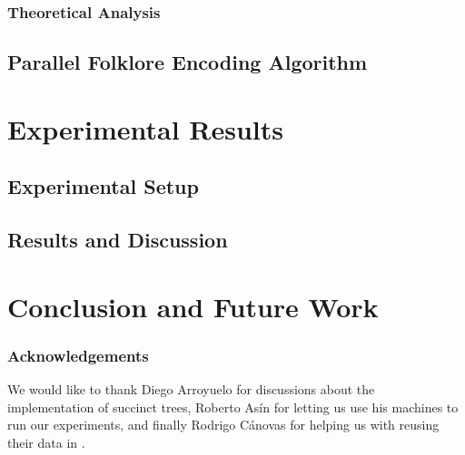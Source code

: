 \documentclass[runningheads]{llncs}
\begin{document}
\subsubsection{Theoretical Analysis}
\label{subsec:theoreticalAnalysis}


%

\subsection{Parallel Folklore Encoding Algorithm}
\label{subsec:parenthesesAlgorithm}


\section{Experimental Results}
\label{sec:exps}


\subsection{Experimental Setup}
\label{subsec:experimentalSetup}


\subsection{Results and Discussion}
\label{subsec:resultsDiscussion}



\section{Conclusion and Future Work}
\label{sec:conclusion}


\subsubsection{Acknowledgements}
We would like to thank Diego Arroyuelo for discussions about the
implementation of succinct trees, Roberto As\'{i}n for letting us use
his machines to run our experiments, and finally Rodrigo C\'{a}novas
for helping us with reusing their data in
\cite{Navarro:2014:FFS:2620785.2601073}.



\end{document}
